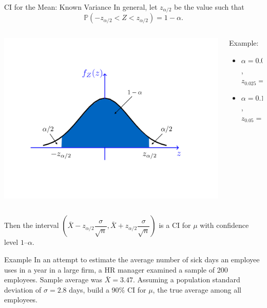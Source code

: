 \documentclass{beamer}
\newcommand{\pr}{\mathbb{P}}
\begin{document}
\begin{frame}{CI for the Mean: Known Variance}
    In general, let $z_{\alpha/2}$ be the value such that 
    $$ \pr(-z_{\alpha/2} < Z < z_{\alpha/2})=1-\alpha. $$
\begin{columns}[T] %
\begin{column}{.4\textwidth}
    \includegraphics[width=1\textwidth]{figures/zscore}
\end{column}%
\hfill%
\begin{column}{.5\textwidth}
\vspace{0.15in}
Example:
\begin{itemize}
\item $\alpha=0.05$, $z_{0.025} = 1.96.$ 
\item $ \alpha=0.1$, $z_{0.05} =  1.64.$
\end{itemize}
\end{column}%
\end{columns}

\vspace{0.05in}
    Then the interval $(\bar X - z_{\alpha/2}\dfrac{\sigma}{\sqrt{n}},\bar X + z_{\alpha/2}\dfrac{\sigma}{\sqrt{n}})$ is a CI for $\mu$ with confidence level $1 –\alpha$.
\end{frame}

\begin{frame}{Example}
In an attempt to estimate the average number of sick days an employee uses in a year in a large firm, 
a HR manager examined a sample of 200 employees. Sample average was $\bar X= 3.47$.  
Assuming a population standard deviation of $\sigma= 2.8$ days, build a 90\% CI for $\mu$, the true average among all employees.
\end{frame}
\end{document}
